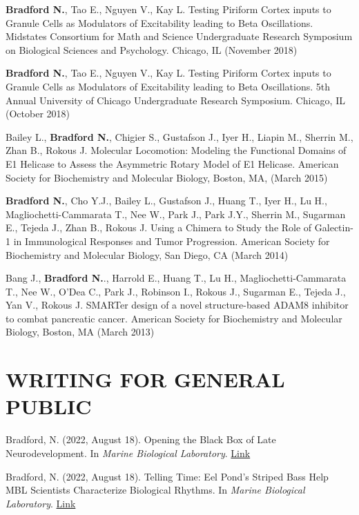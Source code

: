 \documentclass[margin, 10pt]{res} %
\begin{document}
\begin{resume}
\textbf{Bradford N.}, Tao E., Nguyen V., Kay L. Testing Piriform Cortex inputs to Granule Cells as Modulators of Excitability leading to Beta Oscillations. Midstates Consortium for Math and Science Undergraduate Research Symposium on Biological Sciences and Psychology. Chicago, IL (November 2018) 

\textbf{Bradford N.}, Tao E., Nguyen V., Kay L. Testing Piriform Cortex inputs to Granule Cells as Modulators of Excitability leading to Beta Oscillations. 5th Annual University of Chicago Undergraduate Research Symposium. Chicago, IL (October 2018)

Bailey L., \textbf{Bradford N.}, Chigier S., Gustafson J., Iyer H., Liapin M., Sherrin M., Zhan B., Rokous J. Molecular Locomotion: Modeling the Functional Domains of E1 Helicase to Assess the Asymmetric Rotary Model of E1 Helicase. American Society for Biochemistry and Molecular Biology, Boston, MA, (March 2015)

\textbf{Bradford N.}, Cho Y.J., Bailey L., Gustafson J., Huang T., Iyer H., Lu H., Magliochetti-Cammarata T., Nee W., Park J., Park J.Y., Sherrin M., Sugarman E., Tejeda J., Zhan B., Rokous J. Using a Chimera to Study the Role of Galectin-1 in Immunological Responses and Tumor Progression. American Society for Biochemistry and Molecular Biology, San Diego, CA (March 2014)

Bang J., \textbf{Bradford N.}., Harrold E., Huang T., Lu H., Magliochetti-Cammarata T., Nee W., O'Dea C., Park J., Robinson I., Rokous J., Sugarman E., Tejeda J., Yan V., Rokous J. SMARTer design of a novel structure-based ADAM8 inhibitor to combat pancreatic cancer. American Society for Biochemistry and Molecular Biology, Boston, MA (March 2013)


\section{WRITING FOR GENERAL PUBLIC}
Bradford, N. (2022, August 18). Opening the Black Box of Late Neurodevelopment. In {\sl Marine Biological Laboratory}. \href{https://www.mbl.edu/news/opening-black-box-late-neurodevelopment}{Link}

Bradford, N. (2022, August 18). Telling Time: Eel Pond’s Striped Bass Help MBL Scientists Characterize Biological Rhythms. In {\sl Marine Biological Laboratory}. \href{https://www.mbl.edu/news/telling-time-eel-ponds-striped-bass-help-mbl-scientists-characterize-biological-rhythms}{Link}


\end{resume}
\end{document}
